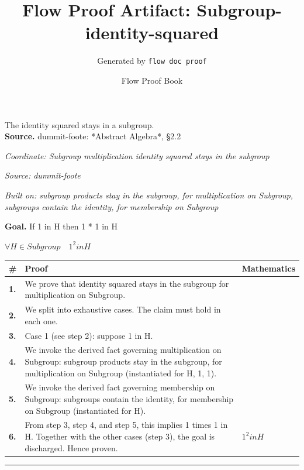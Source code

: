 \documentclass[11pt]{article}
\title{Flow Proof Artifact: Subgroup-identity-squared}
\author{Generated by \texttt{flow doc proof}}
\date{Flow Proof Book}
\theoremstyle{definition}
\begin{document}
\maketitle
The identity squared stays in a subgroup.\\[0.5em]
\textbf{Source.} dummit-foote: *Abstract Algebra*, §2.2\\[0.5em]
\bigskip
{}\par
\smallskip\noindent\textit{Coordinate: Subgroup \cdot multiplication \cdot identity squared stays in the subgroup}\par
\smallskip\noindent\textit{Source: dummit-foote}\par
\smallskip\noindent\textit{Built on: subgroup products stay in the subgroup, for multiplication on Subgroup, subgroups contain the identity, for membership on Subgroup}\par
\medskip
\noindent\textbf{Goal.} If 1 in H then 1 * 1 in H\par
\noindent$\displaystyle \forall H \in Subgroup\quad 1^{2} in H$\par
\medskip
\noindent
\begin{tabular}{@{} >{\raggedright\arraybackslash}p{} >{\raggedright\arraybackslash}p{} >{\raggedleft\arraybackslash}p{} @{}}
\textbf{\#} & \textbf{Proof} & \textbf{Mathematics} \\
\midrule
\textbf{1.} & We prove that identity squared stays in the subgroup for multiplication on Subgroup. & \\[0.45em]
\textbf{2.} & We split into exhaustive cases. The claim must hold in each one. & \\[0.45em]
\textbf{3.} & Case 1 (see step 2): suppose 1 in H. & \\[0.45em]
\textbf{4.} & We invoke the derived fact governing multiplication on Subgroup: subgroup products stay in the subgroup, for multiplication on Subgroup (instantiated for H, 1, 1). & \\[0.45em]
\textbf{5.} & We invoke the derived fact governing membership on Subgroup: subgroups contain the identity, for membership on Subgroup (instantiated for H). & \\[0.45em]
\textbf{6.} & From step 3, step 4, and step 5, this implies 1 times 1 in H. Together with the other cases (step 3), the goal is discharged. Hence proven. & $\displaystyle 1^{2} in H$ \\[0.45em]
\bottomrule
\end{tabular}
\label{thm:Subgroup-multiplication-identity_squared_stays_in_the_subgroup}
\par\medskip\hrule
\end{document}
